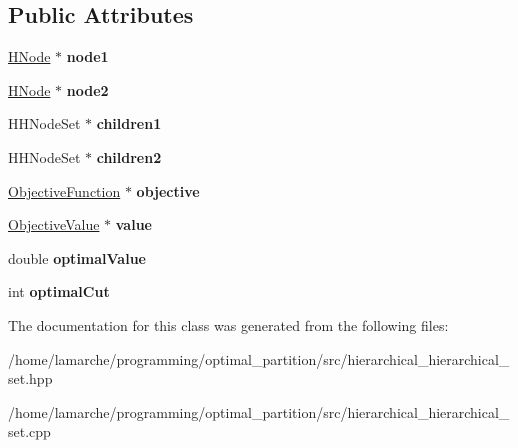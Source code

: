 \subsection*{Public Attributes}
\begin{DoxyCompactItemize}
\item 
\hypertarget{classHHNode_a8a4840e3b550450038aa6cf08664a10f}{\hyperlink{classHNode}{H\-Node} $\ast$ {\bfseries node1}}\label{classHHNode_a8a4840e3b550450038aa6cf08664a10f}

\item 
\hypertarget{classHHNode_a27dca34d04c73268088acaa3f63c3cf1}{\hyperlink{classHNode}{H\-Node} $\ast$ {\bfseries node2}}\label{classHHNode_a27dca34d04c73268088acaa3f63c3cf1}

\item 
\hypertarget{classHHNode_a30f76c1b6af3e718fed25daf3f201867}{H\-H\-Node\-Set $\ast$ {\bfseries children1}}\label{classHHNode_a30f76c1b6af3e718fed25daf3f201867}

\item 
\hypertarget{classHHNode_ae834d94db3d05c0611cae96b65310a3f}{H\-H\-Node\-Set $\ast$ {\bfseries children2}}\label{classHHNode_ae834d94db3d05c0611cae96b65310a3f}

\item 
\hypertarget{classHHNode_a699ca440cd845b1605ac39da167a3ef6}{\hyperlink{classObjectiveFunction}{Objective\-Function} $\ast$ {\bfseries objective}}\label{classHHNode_a699ca440cd845b1605ac39da167a3ef6}

\item 
\hypertarget{classHHNode_ae38edb82e59ed2a8265212861234bb86}{\hyperlink{classObjectiveValue}{Objective\-Value} $\ast$ {\bfseries value}}\label{classHHNode_ae38edb82e59ed2a8265212861234bb86}

\item 
\hypertarget{classHHNode_a95b0f06e417e1805649993b1105c0353}{double {\bfseries optimal\-Value}}\label{classHHNode_a95b0f06e417e1805649993b1105c0353}

\item 
\hypertarget{classHHNode_a4f9897665bc4098b16432f619cbb4545}{int {\bfseries optimal\-Cut}}\label{classHHNode_a4f9897665bc4098b16432f619cbb4545}

\end{DoxyCompactItemize}


The documentation for this class was generated from the following files\-:\begin{DoxyCompactItemize}
\item 
/home/lamarche/programming/optimal\-\_\-partition/src/hierarchical\-\_\-hierarchical\-\_\-set.\-hpp\item 
/home/lamarche/programming/optimal\-\_\-partition/src/hierarchical\-\_\-hierarchical\-\_\-set.\-cpp\end{DoxyCompactItemize}
